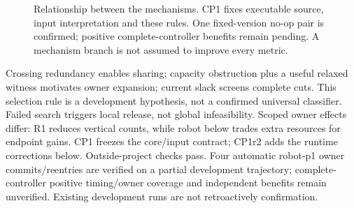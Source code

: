 \documentclass[conference,10pt]{IEEEtran}
\begin{document}
\begin{figure}[t]
\centering\footnotesize
{}
\caption{Relationship between the mechanisms. CP1 fixes executable source, input interpretation and these rules. One fixed-version no-op pair is confirmed; positive complete-controller benefits remain pending. A mechanism branch is not assumed to improve every metric.}
\label{fig:method}
\end{figure}

Crossing redundancy enables sharing; capacity obstruction plus a useful relaxed witness motivates owner expansion; current slack screens complete cuts. This selection rule is a development hypothesis, not a confirmed universal classifier. Failed search triggers local release, not global infeasibility. Scoped owner effects differ: R1 reduces vertical counts, while robot below trades extra resources for endpoint gains. CP1 freezes the core/input contract; CP1r2 adds the runtime corrections below. Outside-project checks pass. Four automatic robot-p1 owner commits/reentries are verified on a partial development trajectory; complete-controller positive timing/owner coverage and independent benefits remain unverified. Existing development runs are not retroactively confirmation.
\end{document}
